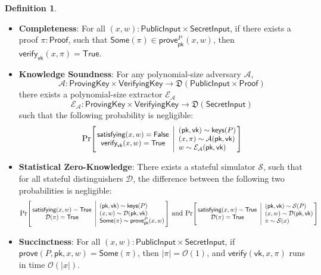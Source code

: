 \documentclass[a4paper]{article}
\theoremstyle{definition}
\newtheorem{definition}{Definition}[subsection]
\renewcommand{\abs}[1]{\left|#1\right|}
\newcommand{\Prob}[2]{\mathrm{Pr}\scalebox{0.88}{\ensuremath{\left[\!\!\begin{array}{c}#1\end{array} \middle| \begin{array}{l}#2\end{array}\!\!\right]}}}
\newcommand{\False}{{\textsf{False}}}
\newcommand{\Proof}{{\textsf{Proof}}}
\newcommand{\ProvingKey}{{\textsf{ProvingKey}}}
\newcommand{\PublicInput}{{\textsf{PublicInput}}}
\newcommand{\SecretInput}{{\textsf{SecretInput}}}
\newcommand{\Some}{{\textsf{Some}}}
\newcommand{\True}{{\textsf{True}}}
\newcommand{\VerifyingKey}{{\textsf{VerifyingKey}}}
\newcommand{\keys}{{\textsf{keys}}}
\newcommand{\pk}{{\textsf{pk}}}
\newcommand{\prove}{{\textsf{prove}}}
\newcommand{\satisfying}{{\textsf{satisfying}}}
\newcommand{\verify}{{\textsf{verify}}}
\newcommand{\vk}{{\textsf{vk}}}
\begin{document}
\begin{definition}
    \begin{itemize}
        \item \textbf{Completeness}: For all $(x, w) : \PublicInput \times \SecretInput$, if there exists a proof $\pi : \Proof$, such that $\Some(\pi) \in \prove^P_\pk(x, w)$, then $\verify_\vk(x, \pi) = \True$.
        \item \textbf{Knowledge Soundness}: For any polynomial-size adversary $\mathcal{A}$,
            \[\mathcal{A} : \ProvingKey \times \VerifyingKey \to \mathfrak{D}(\PublicInput \times \Proof)\]
             there exists a polynomial-size extractor $\mathcal{E}_\mathcal{A}$
            \[\mathcal{E}_\mathcal{A} : \ProvingKey \times \VerifyingKey \to \mathfrak{D}(\SecretInput)\]
            such that the following probability is negligible:
            \[
                \Prob{
                    \satisfying(x, w) = \False \\
                    \verify_\vk(x, w) = \True
                }{
                    (\pk, \vk) \sim \keys(P) \\
                    (x, \pi) \sim \mathcal{A}(\pk, \vk) \\
                    w \sim \mathcal{E}_\mathcal{A}(\pk, \vk)
                }
            \]
        \item \textbf{Statistical Zero-Knowledge}: There exists a stateful simulator $\mathcal{S}$, such that for all stateful distinguishers $\mathcal{D}$, the difference between the following two probabilities is negligible:
            \[
                \Prob{
                    \satisfying(x, w) = \True \\
                    \mathcal{D}(\pi) = \True
                }{
                    (\pk, \vk) \sim \keys(P) \\
                    (x, w) \sim \mathcal{D}(\pk, \vk) \\
                    \Some(\pi) \sim \prove^P_\pk(x, w)
                }
                \,\,\text{and}\,\,
                \Prob{
                    \satisfying(x, w) = \True \\
                    \mathcal{D}(\pi) = \True
                }{
                    (\pk, \vk) \sim \mathcal{S}(P) \\
                    (x, w) \sim \mathcal{D}(\pk, \vk) \\
                    \pi \sim \mathcal{S}(x)
                }
            \]
        \item \textbf{Succinctness}: For all $(x, w) : \PublicInput \times \SecretInput$, if $\prove(P, \pk, x, w) = \Some(\pi)$, then $\abs{\pi} = \mathcal{O}(1)$, and $\verify(\vk, x, \pi)$ runs in time $\mathcal{O}(\abs{x})$.
    \end{itemize}
\end{definition}
\end{document}
